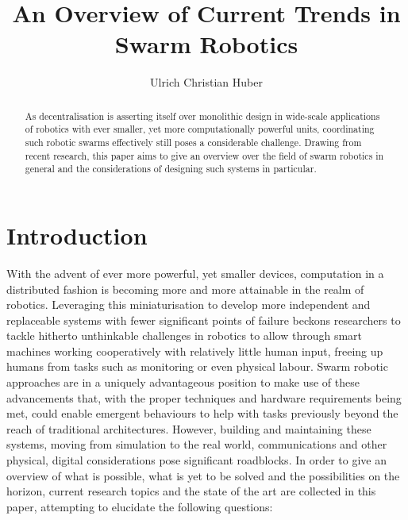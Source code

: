 \documentclass{article}
\begin{document}
	\author{%
		Ulrich Christian Huber%
	}
	
\title{An Overview of Current Trends in Swarm Robotics}

\maketitle
	
	
\begin{abstract}
As decentralisation is asserting itself over monolithic design in wide-scale applications of robotics with ever smaller, yet more computationally powerful units, coordinating such robotic swarms effectively still poses a considerable challenge. Drawing from recent research, this paper aims to give an overview over the field of swarm robotics in general and the considerations of designing such systems in particular.
\end{abstract}
\section{Introduction}

With the advent of ever more powerful, yet smaller devices, computation in a distributed fashion is becoming more and more attainable in the realm of robotics. Leveraging this miniaturisation to develop more independent and replaceable systems with fewer significant points of failure beckons researchers to tackle hitherto unthinkable challenges in robotics to allow through smart machines working cooperatively with relatively little human input, freeing up humans from tasks such as monitoring or even physical labour. Swarm robotic approaches are in a uniquely advantageous position to make use of these advancements that, with the proper techniques and hardware requirements being met, could enable emergent behaviours to help with tasks previously beyond the reach of traditional architectures. However, building and maintaining these systems, moving from simulation to the real world, communications and other physical, digital considerations pose significant roadblocks. In order to give an overview of what is possible, what is yet to be solved and the possibilities on the horizon, current research topics and the state of the art are collected in this paper, attempting to elucidate the following questions:
\end{document}
